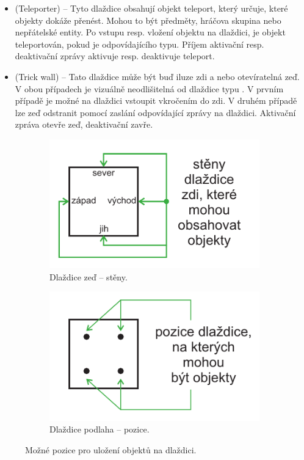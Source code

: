 \begin{itemize}
\item {} (Teleporter) -- Tyto dlaždice obsahují objekt teleport, který určuje, které objekty dokáže přenést. Mohou to být
	předměty, hráčova skupina nebo nepřátelské entity. Po vstupu resp. vložení objektu na dlaždici, je objekt teleportován, pokud
	je odpovídajícího typu. Příjem aktivační resp. deaktivační zprávy aktivuje resp. deaktivuje teleport.

\item {} (Trick wall) -- Tato dlaždice může být buď iluze zdi a nebo otevíratelná zeď. V obou případech je vizuálně neodlišitelná
	od dlaždice typu . V prvním případě je možné na dlaždici vstoupit vkročením do zdi. V druhém případě lze
	zeď odstranit pomocí zaslání odpovídající zprávy na dlaždici. Aktivační zpráva otevře zeď, deaktivační zavře.
\end{itemize}

	\begin{figure}[H]
    \centering
    \begin{subfigure}[b]{0.45\textwidth}
        \includegraphics[width=\textwidth]{./img/DM-wall-sides}
        \caption{Dlaždice zeď -- stěny.}
        \label{wall:analyza}
    \end{subfigure}
    \begin{subfigure}[b]{0.45\textwidth}
        \includegraphics[width=\textwidth]{./img/DM-floor-spaces}
        \caption{Dlaždice podlaha -- pozice.}
        \label{floor:analyza}
    \end{subfigure}
    \caption{Možné pozice pro uložení objektů na dlaždici.}\label{tile-positions:analyza}
\end{figure}

